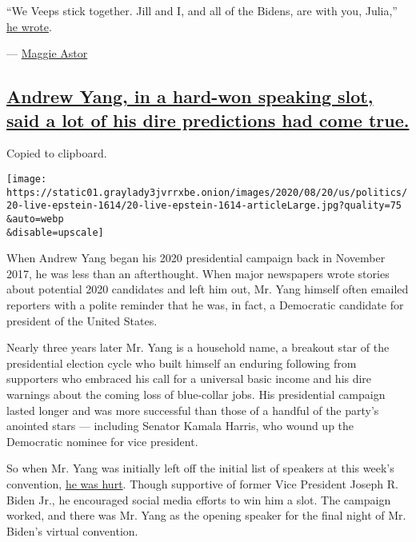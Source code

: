 ``We Veeps stick together. Jill and I, and all of the Bidens, are with
you, Julia,''
\href{https://twitter.com/JoeBiden/status/913531470001602565?s=20}{he
wrote}.

--- \href{https://www.nytimes3xbfgragh.onion/by/maggie-astor}{Maggie
Astor}

\hypertarget{andrew-yang-in-a-hard-won-speaking-slot-said-a-lot-of-his-dire-predictions-had-come-true}{%
\subsection{\texorpdfstring{\protect\hyperlink{andrew-yang-in-a-hard-won-speaking-slot-said-a-lot-of-his-dire-predictions-had-come-true}{Andrew
Yang, in a hard-won speaking slot, said a lot of his dire predictions
had come
true.}}{Andrew Yang, in a hard-won speaking slot, said a lot of his dire predictions had come true.}}\label{andrew-yang-in-a-hard-won-speaking-slot-said-a-lot-of-his-dire-predictions-had-come-true}}

Copied to clipboard.

\texttt{[image: https://static01.graylady3jvrrxbe.onion/images/2020/08/20/us/politics/20-live-epstein-1614/20-live-epstein-1614-articleLarge.jpg?quality=75\\\&auto=webp\\\&disable=upscale]}

When Andrew Yang began his 2020 presidential campaign back in November
2017, he was less than an afterthought. When major newspapers wrote
stories about potential 2020 candidates and left him out, Mr. Yang
himself often emailed reporters with a polite reminder that he was, in
fact, a Democratic candidate for president of the United States.

Nearly three years later Mr. Yang is a household name, a breakout star
of the presidential election cycle who built himself an enduring
following from supporters who embraced his call for a universal basic
income and his dire warnings about the coming loss of blue-collar jobs.
His presidential campaign lasted longer and was more successful than
those of a handful of the party's anointed stars --- including Senator
Kamala Harris, who wound up the Democratic nominee for vice president.

So when Mr. Yang was initially left off the initial list of speakers at
this week's convention,
\href{https://twitter.com/andrewyang/status/1293211531551952897}{he was
hurt}. Though supportive of former Vice President Joseph R. Biden Jr.,
he encouraged social media efforts to win him a slot. The campaign
worked, and there was Mr. Yang as the opening speaker for the final
night of Mr. Biden's virtual convention.

